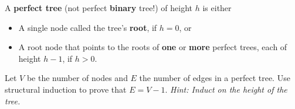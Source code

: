 \documentclass[letterpaper,12pt]{article}
\begin{document}

{\large A {\bf perfect tree} (not perfect {\bf binary} tree!) of height $h$ is either

\begin{itemize}
	\item A single node called the tree's \textbf{root}, if $h=0$, or 
	\item A root node that points to the roots of \textbf{one} or \textbf{more} perfect trees, each of height $h - 1$, if $h>0$.
\end{itemize}

Let $V$ be the number of nodes and $E$ the number of edges in a perfect tree.  Use structural induction to prove that $E=V - 1$.  \textit{Hint: Induct on the height of the tree.}
}
\standardinductionspace

\end{document}
